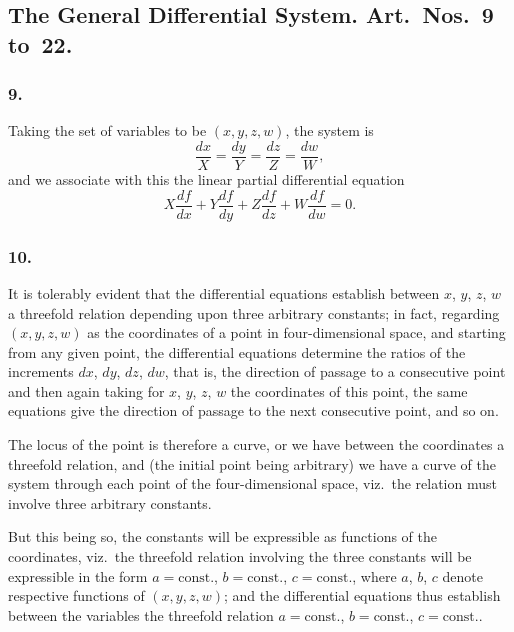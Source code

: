 \documentclass[11pt,a4paper]{book}
\begin{document}
\newpage
\setcounter{page}{118}

\subsection*{The General Differential System. Art.~Nos.~9 to~22.}

\subsubsection*{9.}

Taking the set of variables to be $(x, y, z, w)$, the system is
\[
\frac{dx}{X} = \frac{dy}{Y} = \frac{dz}{Z} = \frac{dw}{W},
\]
and we associate with this the linear partial differential equation
\[
X\frac{df}{dx} + Y\frac{df}{dy} + Z\frac{df}{dz} + W\frac{df}{dw} = 0.
\]

\subsubsection*{10.}

It is tolerably evident that the differential equations establish between $x$, $y$, $z$, $w$ a threefold relation depending upon three arbitrary constants; in fact, regarding $(x, y, z, w)$ as the coordinates of a point in four-dimensional space, and starting from any given point, the differential equations determine the ratios of the increments $dx$, $dy$, $dz$, $dw$, that is, the direction of passage to a consecutive point and then again taking for $x$, $y$, $z$, $w$ the coordinates of this point, the same equations give the direction of passage to the next consecutive point, and so on.

The locus of the point is therefore a curve, or we have between the coordinates a threefold relation, and (the initial point being arbitrary) we have a curve of the system through each point of the four-dimensional space, viz.~the relation must involve three arbitrary constants.

But this being so, the constants will be expressible as functions of the coordinates, viz.~the threefold relation involving the three constants will be expressible in the form $a = \text{const.}$, $b = \text{const.}$, $c = \text{const.}$, where $a$, $b$, $c$ denote respective functions of $(x, y, z, w)$; and the differential equations thus establish between the variables the threefold relation $a = \text{const.}$, $b = \text{const.}$, $c = \text{const.}$.

\newpage
\setcounter{page}{119}
\end{document}
